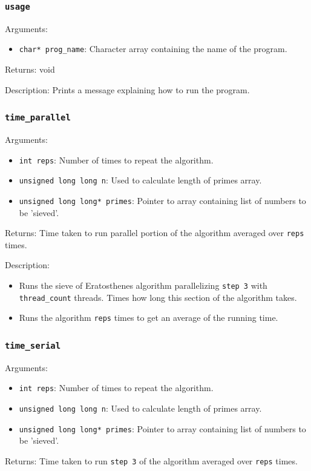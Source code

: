 \documentclass{article}
\begin{document}
\subsubsection{\texttt{usage}}
Arguments: 
    \begin{itemize}
	    \item \texttt{char* prog\_name}: Character array containing the name of the program.
    \end{itemize}
Returns: void

\medskip
\noindent
Description: Prints a message explaining how to run the program.

\subsubsection{\texttt{time\_parallel}}
Arguments: 
    \begin{itemize}
	    \item \texttt{int reps}: Number of times to repeat the algorithm.
	    
	    \item \texttt{unsigned long long n}: Used to calculate length of primes array.
	    
	    \item \texttt{unsigned long long* primes}: Pointer to array containing list of numbers to be 'sieved'.
    \end{itemize}
Returns: Time taken to run parallel portion of the algorithm averaged over \texttt{reps} times.

\medskip
\noindent
Description: 
\begin{itemize}
    \item Runs the sieve of Eratosthenes algorithm parallelizing \texttt{step 3} with \texttt{thread\_count} threads. Times how long this section of the algorithm takes.

    \item Runs the algorithm \texttt{reps} times to get an average of the running time.
\end{itemize}

\subsubsection{\texttt{time\_serial}}
Arguments: 
    \begin{itemize}
	    \item \texttt{int reps}: Number of times to repeat the algorithm.
	    
	    \item \texttt{unsigned long long n}: Used to calculate length of primes array.
	    
	    \item \texttt{unsigned long long* primes}: Pointer to array containing list of numbers to be 'sieved'.
    \end{itemize}
Returns: Time taken to run \texttt{step 3} of the algorithm averaged over \texttt{reps} times.
\end{document}
